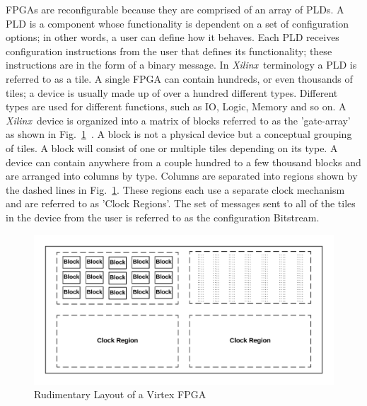 \documentclass[conference]{IEEEtran}
\newcommand{\Xilinx}{\textit{\gls{Xilinx}}~}
\begin{document}
\acrshort{FPGA}s are reconfigurable because they are comprised of an array of \acrfull{PLDs}.
A \acrshort{PLD} is a component whose functionality is dependent on a set of configuration options; in other words, a user can define how it behaves.
Each \acrshort{PLD} receives configuration instructions from the user that defines its functionality; these instructions are in the form of a binary message.
In \Xilinx terminology a \acrshort{PLD} is referred to as a tile. 
A single \acrshort{FPGA} can contain hundreds, or even thousands of tiles; a device is usually made up of over a hundred different types.
Different types are used for different functions, such as \acrfull{IO}, Logic, Memory and so on.
A \Xilinx device is organized into a matrix of blocks referred to as the 'gate-array' as shown in Fig.~\ref{fig:FPGA}~\cite{xilnxDevManual}.
A block is not a physical device but a conceptual grouping of tiles.
A block will consist of one or multiple tiles depending on its type.
A device can contain anywhere from a couple hundred to a few thousand blocks and are arranged into columns by type.
Columns are separated into regions shown by the dashed lines in Fig.~\ref{fig:FPGA}.
These regions each use a separate clock mechanism and are referred to as 'Clock Regions'.
The set of messages sent to all of the tiles in the device from the user is referred to as the configuration \gls{Bitstream}.

\begin{figure}[h]
	\centering
	\includegraphics[width=1\linewidth]{../Thesis/Figures/FPGA}
	\caption[Rudimentary Layout of a Virtex \acrshort{FPGA}]{Rudimentary Layout of a Virtex \acrshort{FPGA}}
	\label{fig:FPGA}
\end{figure}
\end{document}
